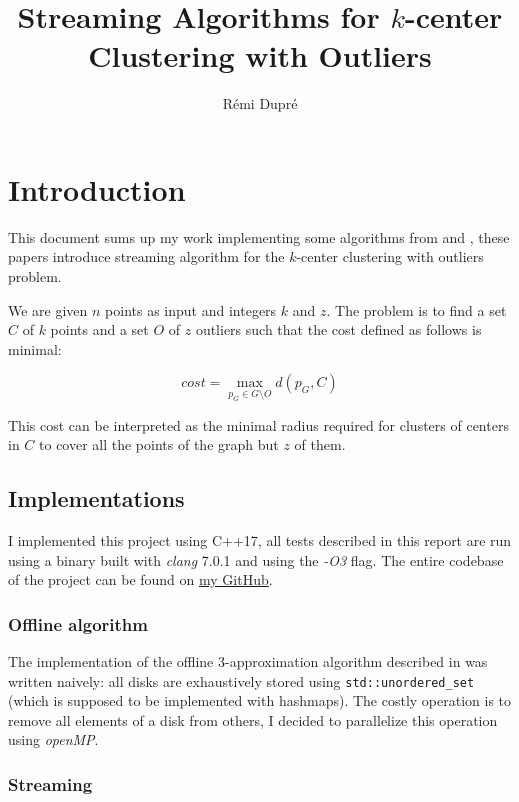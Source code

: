 \documentclass{article}
\title{Streaming Algorithms for $k$-center Clustering with Outliers}
\author{Rémi Dupré}
\begin{document}
\maketitle


\section{Introduction}

  This document sums up my work implementing some algorithms from \cite{CKMN01}
  and \cite{MK08}, these papers introduce streaming algorithm for the
  $k$-center clustering with outliers problem.

  We are given $n$ points as input and integers $k$ and $z$. The problem is to
  find a set $C$ of $k$ points and a set $O$ of $z$ outliers such that the cost
  defined as follows is minimal:

  $$cost = \max\limits_{p_G \in G \setminus O} d(p_G, C)$$

  This cost can be interpreted as the minimal radius required for clusters of
  centers in $C$ to cover all the points of the graph but $z$ of them.

  \subsection{Implementations}

    I implemented this project using C++17, all tests described in this report
    are run using a binary built with \textit{clang} 7.0.1 and using the
    \textit{-O3} flag. The entire codebase of the project can be found on
    \href{https://github.com/remi-dupre/cluster-outliers}{my GitHub}.

    \subsubsection{Offline algorithm}

      The implementation of the offline 3-approximation algorithm described in
      \cite{CKMN01} was written naively: all disks are exhaustively stored
      using \texttt{std::unordered\_set} (which is supposed to be implemented
      with hashmaps). The costly operation is to remove all elements of a disk
      from others, I decided to parallelize this operation using
      \textit{openMP}.

    \subsubsection{Streaming}
\end{document}
